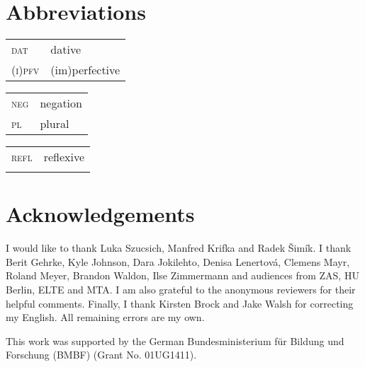 \documentclass[output=paper,  modfonts,  newtxmath,  hidelinks		  ]{langscibook}
\begin{document}
\section*{Abbreviations}
\begin{tabularx}{.333\textwidth}{@{}lQ@{}}
\textsc{dat} & dative \\
\textsc{(i)pfv} & (im)perfective\\
\end{tabularx}%
\begin{tabularx}{.333\textwidth}{@{}lQ@{}}
\textsc{neg} & negation\\
\textsc{pl}&plural\\
\end{tabularx}%
\begin{tabularx}{.333\textwidth}{@{}lQ@{}}
\textsc{refl}&reflexive\\
{}&{}\\
\end{tabularx}

 \section*{Acknowledgements}
I would like to thank Luka Szucsich, Manfred Krifka and Radek \v{S}imík. I thank Berit Gehrke, Kyle Johnson, Dara Jokilehto, Denisa Lenertová, Clemens Mayr, Roland Meyer, Brandon Waldon, Ilse Zimmermann and audiences from ZAS, HU Berlin, ELTE and MTA. I am also grateful to the anonymous reviewers for their helpful comments. Finally, I thank Kirsten Brock and Jake Walsh for correcting my English. All remaining errors are my own.

This work was supported by the German Bundesministerium für Bildung und Forschung (BMBF) (Grant No. 01UG1411).

\sloppy
\printbibliography[heading=subbibliography,notkeyword=this]
\end{document}
